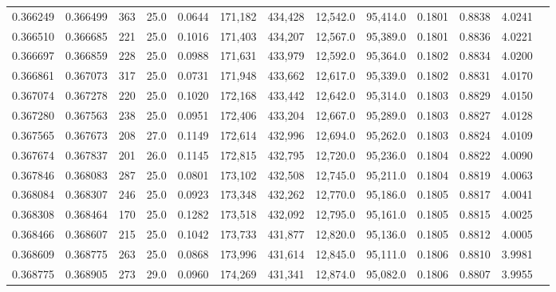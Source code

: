 \begin{tabular}{rrrrrrrrrrrrr}
0.366249 & 0.366499 &   363 & 25.0 &                                     0.0644 & 171,182 & 434,428 &  12,542.0 &  95,414.0 & 0.1801 & 0.8838 & 4.0241 \\
0.366510 & 0.366685 &   221 & 25.0 &                                     0.1016 & 171,403 & 434,207 &  12,567.0 &  95,389.0 & 0.1801 & 0.8836 & 4.0221 \\
0.366697 & 0.366859 &   228 & 25.0 &                                     0.0988 & 171,631 & 433,979 &  12,592.0 &  95,364.0 & 0.1802 & 0.8834 & 4.0200 \\
0.366861 & 0.367073 &   317 & 25.0 &                                     0.0731 & 171,948 & 433,662 &  12,617.0 &  95,339.0 & 0.1802 & 0.8831 & 4.0170 \\
0.367074 & 0.367278 &   220 & 25.0 &                                     0.1020 & 172,168 & 433,442 &  12,642.0 &  95,314.0 & 0.1803 & 0.8829 & 4.0150 \\
0.367280 & 0.367563 &   238 & 25.0 &                                     0.0951 & 172,406 & 433,204 &  12,667.0 &  95,289.0 & 0.1803 & 0.8827 & 4.0128 \\
0.367565 & 0.367673 &   208 & 27.0 &                                     0.1149 & 172,614 & 432,996 &  12,694.0 &  95,262.0 & 0.1803 & 0.8824 & 4.0109 \\
0.367674 & 0.367837 &   201 & 26.0 &                                     0.1145 & 172,815 & 432,795 &  12,720.0 &  95,236.0 & 0.1804 & 0.8822 & 4.0090 \\
0.367846 & 0.368083 &   287 & 25.0 &                                     0.0801 & 173,102 & 432,508 &  12,745.0 &  95,211.0 & 0.1804 & 0.8819 & 4.0063 \\
0.368084 & 0.368307 &   246 & 25.0 &                                     0.0923 & 173,348 & 432,262 &  12,770.0 &  95,186.0 & 0.1805 & 0.8817 & 4.0041 \\
0.368308 & 0.368464 &   170 & 25.0 &                                     0.1282 & 173,518 & 432,092 &  12,795.0 &  95,161.0 & 0.1805 & 0.8815 & 4.0025 \\
0.368466 & 0.368607 &   215 & 25.0 &                                     0.1042 & 173,733 & 431,877 &  12,820.0 &  95,136.0 & 0.1805 & 0.8812 & 4.0005 \\
0.368609 & 0.368775 &   263 & 25.0 &                                     0.0868 & 173,996 & 431,614 &  12,845.0 &  95,111.0 & 0.1806 & 0.8810 & 3.9981 \\
0.368775 & 0.368905 &   273 & 29.0 &                                     0.0960 & 174,269 & 431,341 &  12,874.0 &  95,082.0 & 0.1806 & 0.8807 & 3.9955 \\

\end{tabular}
